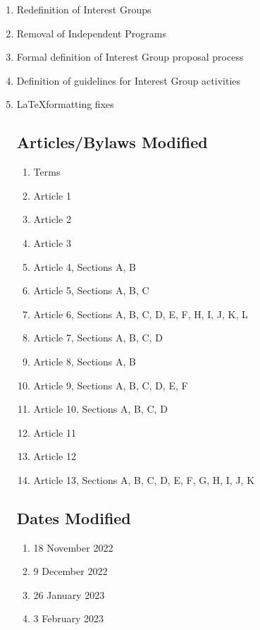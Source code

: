 \begin{enumerate}
      \item Redefinition of Interest Groups
      \item Removal of Independent Programs
      \item Formal definition of Interest Group proposal process
      \item Definition of guidelines for Interest Group activities
      \item \LaTeX\space formatting fixes

            \subsection{Articles/Bylaws Modified}
            \begin{enumerate}
                  \item Terms
                  \item Article 1
                  \item Article 2
                  \item Article 3
                  \item Article 4, Sections A, B
                  \item Article 5, Sections A, B, C
                  \item Article 6, Sections A, B, C, D, E, F, H, I, J, K, L
                  \item Article 7, Sections A, B, C, D
                  \item Article 8, Sections A, B
                  \item Article 9, Sections A, B, C, D, E, F
                  \item Article 10, Sections A, B, C, D
                  \item Article 11
                  \item Article 12
                  \item Article 13, Sections A, B, C, D, E, F, G, H, I, J, K
            \end{enumerate}

            \subsection{Dates Modified}
            \begin{enumerate}
                  \item 18 November 2022
                  \item 9 December 2022
                  \item 26 January 2023
                  \item 3 February 2023
            \end{enumerate}


\end{enumerate}

